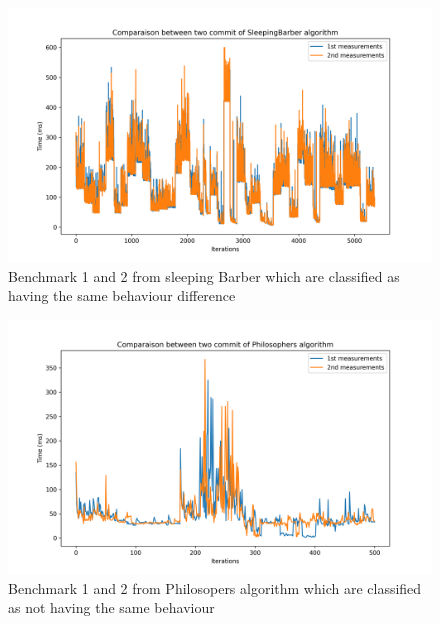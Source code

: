 \documentclass{article}
\begin{document}
\begin{figure}[]
    \centering
    \includegraphics[width=1\textwidth]{images/plot_SleepingBarber_4.069999999999936.png}
    \caption{Benchmark 1 and 2 from sleeping Barber which are classified as having the same behaviour difference}
    \label{fig:bench_1_2_1}
\end{figure}

\begin{figure}[]
    \centering
    \includegraphics[width=1\textwidth]{images/plot_Philosophers_42.533000000000015.png}
    \caption{Benchmark 1 and 2 from Philosopers algorithm which are classified as not having the same behaviour}
    \label{fig:bench_1_2_2}
\end{figure}
\end{document}
